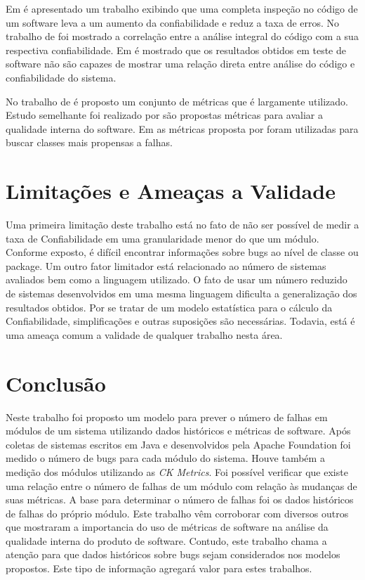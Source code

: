 \documentclass[12pt]{article}
\begin{document}
Em \cite{frankl1988applicable,horgan1994achieving} é apresentado um trabalho
exibindo que uma completa inspeção no código de um software leva a um aumento da
confiabilidade e reduz a taxa de erros. No trabalho de \cite{chen1995effect} foi
mostrado a correlação entre a análise integral do código com a sua respectiva
confiabilidade. Em \cite{briand1999using} é mostrado que os resultados obtidos
em teste de software não são capazes de mostrar uma relação direta entre análise
do código e confiabilidade do sistema.


No trabalho de \cite{chidamber1994metrics} é proposto um conjunto de métricas
que é largamente utilizado. Estudo semelhante foi realizado por
\cite{abreu1994object} são propostas métricas para avaliar a qualidade interna
do software. Em \cite{basili1996validation} as métricas proposta por
\cite{chidamber1994metrics} foram utilizadas para buscar classes mais propensas
a falhas.

\section{Limitações e Ameaças a Validade}
\label{sec:limitacoes}

Uma primeira limitação deste trabalho está no fato de não ser possível de medir
a taxa de Confiabilidade em uma granularidade menor do que um módulo. Conforme
exposto, é difícil encontrar informações sobre bugs ao nível de classe ou
package. Um outro fator limitador está relacionado ao número de sistemas
avaliados bem como a linguagem utilizado. O fato de usar um número reduzido de
sistemas desenvolvidos em uma mesma linguagem dificulta a generalização dos
resultados obtidos. Por se tratar de um modelo estatística para o cálculo da
Confiabilidade, simplificações e outras suposições são necessárias. Todavia,
está é uma ameaça comum a validade de qualquer trabalho nesta área.

\section{Conclusão}
\label{sec:conclusao}
Neste trabalho foi proposto um modelo para prever o número de falhas em módulos
de um sistema utilizando dados históricos e métricas de software. Após coletas
de sistemas escritos em Java e desenvolvidos pela Apache Foundation foi medido o
número de bugs para cada módulo do sistema. Houve também a medição dos módulos
utilizando as \textit{CK Metrics}. Foi possível verificar que existe uma relação
entre o número de falhas de um módulo com relação às mudanças de suas métricas.
A base para determinar o número de falhas foi os dados históricos de falhas do
próprio módulo. Este trabalho vêm corroborar com diversos outros que mostraram a
importancia do uso de métricas de software na análise da qualidade interna do
produto de software. Contudo, este trabalho chama a atenção para que dados
históricos sobre bugs sejam considerados nos modelos propostos. Este tipo de
informação agregará valor para estes trabalhos.



\end{document}
